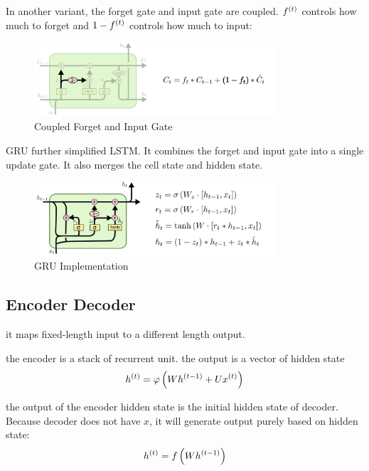 \begin{definition}
    In another variant, the forget gate and input gate are coupled. ${f}^{(t)}$ controls how much to forget and $1- {f}^{(t)}$ controls how much to input:
    \begin{figure}[H]
\includegraphics[width=0.8\textwidth]{machine_learning/pic/04/LSTM3-var-tied.png}
\centering
\caption{Coupled Forget and Input Gate}
\end{figure}
\end{definition}


\begin{definition}[GRU]
    GRU further simplified LSTM. It combines the forget and input gate into a single update gate. It also merges the cell state and hidden state.
\begin{figure}[H]
\includegraphics[width=0.8\textwidth]{machine_learning/pic/04/LSTM3-var-GRU.png}
\centering
\caption{GRU Implementation}
\end{figure}
\end{definition}



\subsection{Encoder Decoder}

it maps fixed-length input to a different length output.

the encoder is a stack of recurrent unit. the output is a vector of hidden state
\begin{equation}
    {h}^{(t)} = \varphi \left(W {h}^{(t-1)} + U {x}^{(t)} \right)
\end{equation}

the output of the encoder hidden state is the initial hidden state of decoder. Because decoder does not have $x$, it will generate output purely based on hidden state:
\begin{equation}
    {h}^{(t)} = f \left(W {h}^{(t-1)} \right)
\end{equation}

